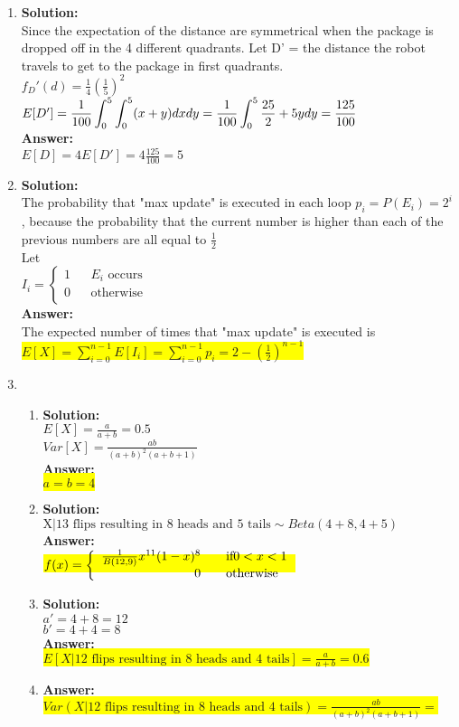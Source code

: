 \documentclass{article}
\newcommand{\myansw}{\textbf{Answer:}\\}
\newcommand{\mysolu}{\textbf{Solution:}\\}
\begin{document}
\begin{enumerate}
\begin{enumerate}
	\end{enumerate}
	\item
	\mysolu
	Since the expectation of the distance are symmetrical when the package is dropped off in the 4 different quadrants. Let D' = the distance the robot travels to get to the package in first quadrants.\\
	${f_D'(d) = \frac{1}{4}(\frac{1}{5})^2}$\\
	${E[D']=\mathlarger{\frac{1}{100}\int_{0}^{5} \int_{0}^{5} (x+y) dxdy=\frac{1}{100}\int_{0}^{5} \frac{25}{2}+5ydy=\frac{125}{100}}}$\\
	\myansw
	${E[D] = 4E[D'] = 4 \frac{125}{100} = 5}$\\
	\item
	\mysolu
	The probability that "max update" is executed in each loop ${p_i =P(E_i)= 2^i}$, because the probability that the current number is higher than each of the previous numbers are all equal to ${\frac{1}{2}}$\\
	Let\\
	${I_i = \left\lbrace \begin{array}{rcl}1 & & E_i \text{ occurs}\\
		0 & &  \text{otherwise}\\
		\end{array}\right.}$\\
	\myansw
	The expected number of times that "max update" is executed is\\
	\colorbox{yellow}{${E[X] = \sum\limits_{i = 0}^{n-1}E[I_i] = \sum\limits_{i = 0}^{n-1}p_i = 2 - (\frac{1}{2})^{n-1}}$}
	
	\item
	\begin{enumerate}
		\item
		\mysolu
		${E[X] = \frac{a}{a+b} = 0.5}$\\
		${Var[X] =\frac{ab}{(a+b)^2(a+b+1)}}$\\
		\myansw
		\colorbox{yellow}{${a = b = 4}$}\\
		\item
		\mysolu
		${\text{X}|\text{13 flips resulting in 8 heads and 5 tails} \sim Beta(4+8, 4+5)}$\\
		\myansw
		\colorbox{yellow}{
			${\mathlarger{f(x) = \left\lbrace \begin{array}{rcl} \frac{1}{B(12,9)}x^{11}(1-x)^{8} & & \text{if} 0<x<1\\
				0 & & \text{otherwise}\\
				\end{array}\right.}}$
		}\\
		\item
		\mysolu
		${a' = 4 + 8 = 12}$\\
		${b' = 4 + 4 = 8}$\\
		\myansw
		\colorbox{yellow}{${E[X|\text{12 flips resulting in 8 heads and 4 tails}] = \frac{a}{a+b} = 0.6}$}\\
		\item
		\myansw
		\colorbox{yellow}{${Var(X|\text{12 flips resulting in 8 heads and 4 tails}) = \frac{ab}{(a+b)^2(a+b+1)}=}$}\\
		

\end{enumerate}
\end{enumerate}
\end{document}

